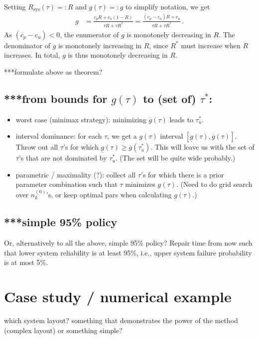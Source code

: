 \documentclass[authoryear]{elsarticle}
\newcommand{\uz}{^{(0)}} %
\newcommand{\ul}[1]{\underline{#1}}
\newcommand{\ol}[1]{\overline{#1}}
\newcommand{\Rsys}{R_\text{sys}}
\newcommand{\lgt}{\ul{g}}
\newcommand{\ugt}{\ol{g}}
\def\nkz{n\uz_k}
\begin{document}
Setting $\Rsys(\tau) =: R$ and $g(\tau) =: g$ to simplify notation, we get
\begin{align*}
g &= \frac{c_p R + c_u (1-R)}{\tau R + \tau R^*}
   = \frac{(c_p - c_u) R + c_u}{\tau R + \tau R^*}\,.
\end{align*}
As $(c_p -c_u) < 0$, the enumerator of $g$ is monotonely decreasing in $R$.
The denominator of $g$ is monotonely increasing in $R$, since $R^*$ must increase when $R$ increases.
In total, $g$ is thus monotonely decreasing in $R$.

***formulate above as theorem?


\subsection{***from bounds for $g(\tau)$ to (set of) $\tau^*$:}

\begin{itemize}
\item worst case (minimax strategy): minimizing $\ugt(\tau)$ leads to $\tau^*_u$.
\item interval dominance: for each $\tau$, we get a $g(\tau)$ interval $[\lgt(\tau), \ugt(\tau)]$.
Throw out all $\tau$'s for which $\lgt(\tau) \ge \ugt(\tau^*_u)$.
This will leave us with the set of $\tau$'s that are not dominated by $\tau^*_u$.
(The set will be quite wide probably.)
\item parametric / maximality (?): collect all $\tau$'s for which there is a prior parameter combination such that $\tau$ minimizes $g(\tau)$.
(Need to do grid search over $\nkz$'s, or keep optimal pars when calculating $\lgt(\tau)$.)
\end{itemize}

\subsection{***simple 95\% policy}

Or, alternatively to all the above, simple 95\% policy?
Repair time from now such that lower system reliability is at least 95\%, i.e., upper system failure probability is at most 5\%.


\section{Case study / numerical example}

which system layout? something that demonstrates the power of the method (complex layout) or something simple?
\end{document}
